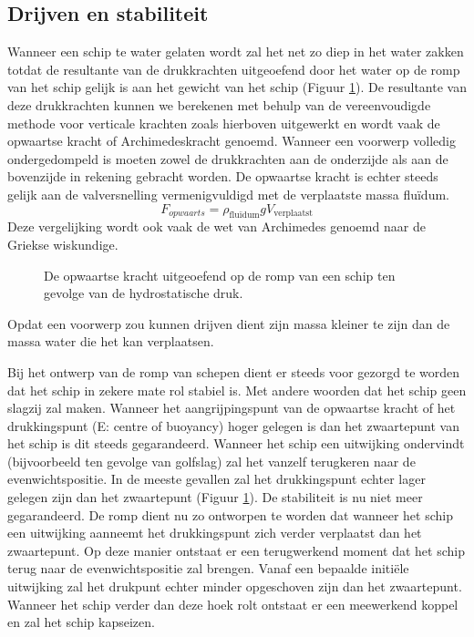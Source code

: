 		\subsection{Drijven en stabiliteit}
Wanneer een schip te water gelaten wordt zal het net zo diep in het water zakken totdat de resultante van de drukkrachten uitgeoefend door het water op de romp van het schip gelijk is aan het gewicht van het schip (Figuur \ref{fig:opwaartse_kracht}). De resultante van deze drukkrachten kunnen we berekenen met behulp van de vereenvoudigde methode voor verticale krachten zoals hierboven uitgewerkt en wordt vaak de opwaartse kracht of Archimedeskracht genoemd. Wanneer een voorwerp volledig ondergedompeld is moeten zowel de drukkrachten aan de onderzijde als aan de bovenzijde in rekening gebracht worden. De opwaartse kracht is echter steeds gelijk aan de valversnelling vermenigvuldigd met de verplaatste massa fluïdum.
\begin{equation}
	F_{opwaarts} = \rho_{\text{fluïdum}} g V_{\text{verplaatst}}
\end{equation}
Deze vergelijking wordt ook vaak de wet van Archimedes genoemd naar de Griekse wiskundige.
\begin{figure}[htb]
	\centering
	
	\caption{De opwaartse kracht uitgeoefend op de romp van een schip ten gevolge van de hydrostatische druk.}
	\label{fig:opwaartse_kracht}
\end{figure}

Opdat een voorwerp zou kunnen drijven dient zijn massa kleiner te zijn dan de massa water die het kan verplaatsen.

Bij het ontwerp van de romp van schepen dient er steeds voor gezorgd te worden dat het schip in zekere mate rol stabiel is. Met andere woorden dat het schip geen slagzij zal maken. Wanneer het aangrijpingspunt van de opwaartse kracht of het drukkingspunt (E: centre of buoyancy) hoger gelegen is dan het zwaartepunt van het schip is dit steeds gegarandeerd. Wanneer het schip een uitwijking ondervindt (bijvoorbeeld ten gevolge van golfslag) zal het vanzelf terugkeren naar de evenwichtspositie. In de meeste gevallen zal het drukkingspunt echter lager gelegen zijn dan het zwaartepunt (Figuur \ref{fig:opwaartse_kracht}). De stabiliteit is nu niet meer gegarandeerd. De romp dient nu zo ontworpen te worden dat wanneer het schip een uitwijking aanneemt het drukkingspunt zich verder verplaatst dan het zwaartepunt. Op deze manier ontstaat er een terugwerkend moment dat het schip terug naar de evenwichtspositie zal brengen. Vanaf een bepaalde initiële uitwijking zal het drukpunt echter minder opgeschoven zijn dan het zwaartepunt. Wanneer het schip verder dan deze hoek rolt ontstaat er een meewerkend koppel en zal het schip kapseizen.